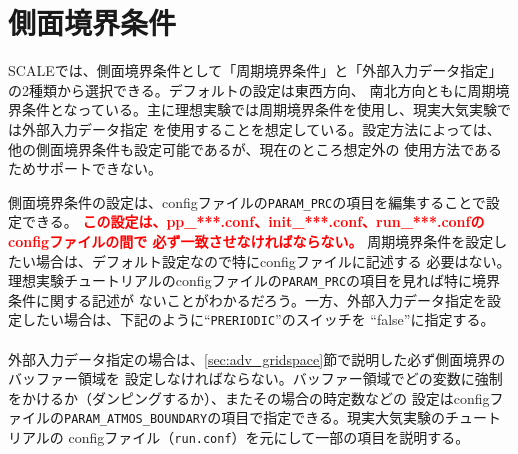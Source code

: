\section{側面境界条件} \label{sec:adv_lateralbnd}
SCALEでは、側面境界条件として「周期境界条件」と「外部入力データ指定」の2種類から選択できる。デフォルトの設定は東西方向、
南北方向ともに周期境界条件となっている。主に理想実験では周期境界条件を使用し、現実大気実験では外部入力データ指定
を使用することを想定している。設定方法によっては、他の側面境界条件も設定可能であるが、現在のところ想定外の
使用方法であるためサポートできない。

側面境界条件の設定は、configファイルの\verb|PARAM_PRC|の項目を編集することで設定できる。
\textcolor{red}{\bf この設定は、pp\_***.conf、init\_***.conf、run\_***.confのconfigファイルの間で
必ず一致させなければならない。} 周期境界条件を設定したい場合は、デフォルト設定なので特にconfigファイルに記述する
必要はない。理想実験チュートリアルのconfigファイルの\verb|PARAM_PRC|の項目を見れば特に境界条件に関する記述が
ないことがわかるだろう。一方、外部入力データ指定を設定したい場合は、下記のように``\verb|PRERIODIC|''のスイッチを
``false''に指定する。\\

\\

\noindent 外部入力データ指定の場合は、\ref{sec:adv_gridspace}節で説明した必ず側面境界のバッファー領域を
設定しなければならない。バッファー領域でどの変数に強制をかけるか（ダンピングするか）、またその場合の時定数などの
設定はconfigファイルの\verb|PARAM_ATMOS_BOUNDARY|の項目で指定できる。現実大気実験のチュートリアルの
configファイル（\verb|run.conf|）を元にして一部の項目を説明する。\\

\\

